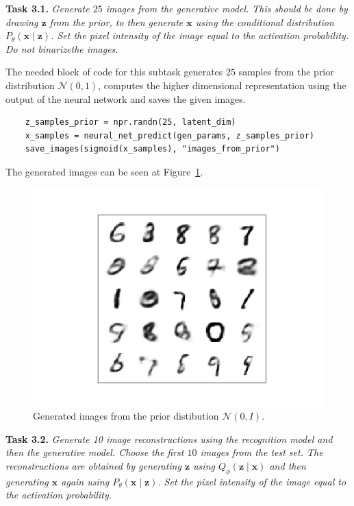 \documentclass[11pt]{article}
\begin{document}
\textbf{Task 3.1.} \emph{Generate \( 25 \) images from the generative model. This should be done by drawing \( \bm{z} \) from the prior, to then generate \( \bm{x} \) using the conditional distribution \( P_{\theta}(\bm{x} \mid \bm{z}) \). Set the pixel intensity of the image equal to the activation probability. Do not binarizethe images.}

The needed block of code for this subtask generates \( 25 \) samples from the prior distribution \( \mathcal{N}(0, 1) \), computes the higher dimensional representation using the output of the neural network and saves the given images.

\begin{verbatim}
    z_samples_prior = npr.randn(25, latent_dim)
    x_samples = neural_net_predict(gen_params, z_samples_prior)
    save_images(sigmoid(x_samples), "images_from_prior")
\end{verbatim}

The generated images can be seen at Figure~\ref{img:3.1}.
\begin{figure}[H]
  \centering
  \includegraphics[scale = 0.5]{imgs/images_from_prior.png}
  \caption{Generated images from the prior distibution \( \mathcal{N}(0, I) \). }\label{img:3.1}
\end{figure}


\textbf{Task 3.2.} \emph{Generate 10 image reconstructions using the recognition model and then the generative model. Choose the first \( 10 \)  images from the test set. The reconstructions are obtained by generating \( \bm{z} \)  using \( Q_{\phi}(\bm{z} \mid \bm{x}) \)  and then generating \( \bm{x} \)  again using \( P_{\theta}(\bm{x} \mid \bm{z}) \). Set the pixel intensity of the image equal to the activation probability.}
\end{document}
